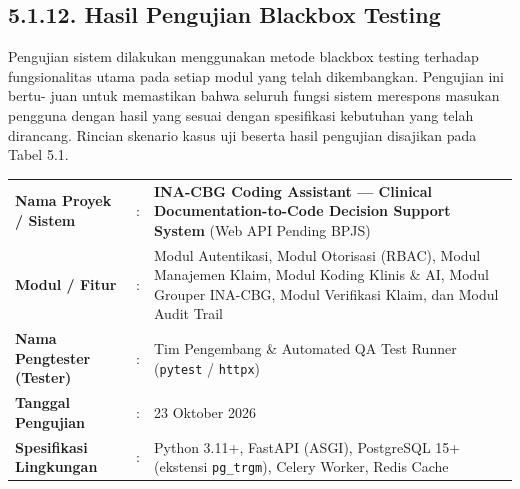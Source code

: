 \documentclass[a4paper,landscape,10pt]{article}
\begin{document}
\subsection*{5.1.12. Hasil Pengujian Blackbox Testing}

Pengujian sistem dilakukan menggunakan metode blackbox testing terhadap
fungsionalitas utama pada setiap modul yang telah dikembangkan. Pengujian ini bertu-
juan untuk memastikan bahwa seluruh fungsi sistem merespons masukan pengguna
dengan hasil yang sesuai dengan spesifikasi kebutuhan yang telah dirancang. Rincian
skenario kasus uji beserta hasil pengujian disajikan pada Tabel 5.1.

\vspace{0.35cm}

\begin{tcolorbox}[title=\textbf{1. Informasi Umum (Header / Identitas Dokumen)}]
\begin{tabular}{@{}p{4.2cm} p{0.3cm} p{21.5cm}@{}}
\textbf{Nama Proyek / Sistem} & : & \textbf{INA-CBG Coding Assistant --- Clinical Documentation-to-Code Decision Support System} (Web API Pending BPJS) \\
\textbf{Modul / Fitur} & : & Modul Autentikasi, Modul Otorisasi (RBAC), Modul Manajemen Klaim, Modul Koding Klinis \& AI, Modul Grouper INA-CBG, Modul Verifikasi Klaim, dan Modul Audit Trail \\
\textbf{Nama Pengtester (Tester)} & : & Tim Pengembang \& Automated QA Test Runner (\texttt{pytest} / \texttt{httpx}) \\
\textbf{Tanggal Pengujian} & : & 23 Oktober 2026 \\
\textbf{Spesifikasi Lingkungan} & : & Python 3.11+, FastAPI (ASGI), PostgreSQL 15+ (ekstensi \texttt{pg\_trgm}), Celery Worker, Redis Cache \\
\end{tabular}
\end{tcolorbox}

\vspace{0.35cm}
\end{document}
